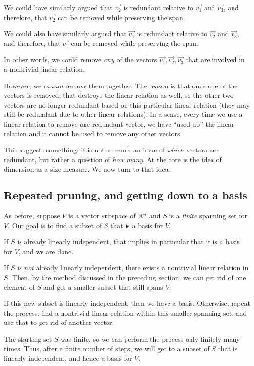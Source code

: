 \documentclass[10pt]{amsart}
\begin{document}
We could have similarly argued that $\vec{v_2}$ is redundant relative
to $\vec{v_1}$ and $\vec{v_3}$, and therefore, that $\vec{v_2}$ can be
removed while preserving the span.

We could also have similarly argued that $\vec{v_1}$ is redundant
relative to $\vec{v_2}$ and $\vec{v_3}$, and therefore, that
$\vec{v_1}$ can be removed while preserving the span.

In other words, we could remove {\em any} of the vectors
$\vec{v_1},\vec{v_2},\vec{v_3}$ that are involved in a nontrivial
linear relation.

However, we {\em cannot} remove them together. The reason is that once
one of the vectors is removed, that destroys the linear relation as
well, so the other two vectors are no longer redundant based on this
particular linear relation (they may still be redundant due to other
linear relations). In a sense, every time we use a linear relation to
remove one redundant vector, we have ``used up'' the linear relation
and it cannot be used to remove any other vectors.

This suggests something: it is not so much an issue of {\em which}
vectors are redundant, but rather a question of {\em how many}. At the
core is the idea of dimension as a size measure. We now turn to that
idea.
\subsection{Repeated pruning, and getting down to a basis}

As before, suppose $V$ is a vector subspace of $\mathbb{R}^n$ and $S$ is a
{\em finite} spanning set for $V$. Our goal is to find a subset of $S$
that is a basis for $V$.

If $S$ is already linearly independent, that implies in particular
that it is a basis for $V$, and we are done.

If $S$ is {\em not} already linearly independent, there exists a
nontrivial linear relation in $S$. Then, by the method discussed in
the preceding section, we can get rid of one element of $S$ and get a
smaller subset that still spans $V$.

If this new subset is linearly independent, then we have a
basis. Otherwise, repeat the process: find a nontrivial linear
relation within this smaller spanning set, and use that to get rid of
another vector.

The starting set $S$ was finite, so we can perform the process only
finitely many times. Thus, after a finite number of steps, we will get
to a subset of $S$ that is linearly independent, and hence a basis for
$V$.
\end{document}
